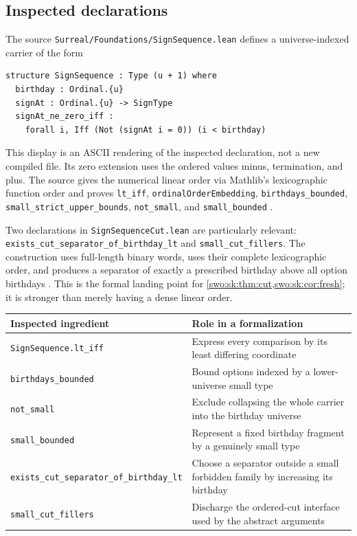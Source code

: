 \documentclass[11pt]{article}
\theoremstyle{definition}
\theoremstyle{remark}
\begin{document}
\subsection{Inspected declarations}

The source \texttt{Surreal/Foundations/SignSequence.lean} defines a
universe-indexed carrier of the form
\begin{lstlisting}
structure SignSequence : Type (u + 1) where
  birthday : Ordinal.{u}
  signAt : Ordinal.{u} -> SignType
  signAt_ne_zero_iff :
    forall i, Iff (Not (signAt i = 0)) (i < birthday)
\end{lstlisting}
This display is an ASCII rendering of the inspected declaration, not a
new compiled file. Its zero extension uses the ordered values minus,
termination, and plus. The source gives the numerical linear order via
Mathlib's lexicographic function order and proves
\texttt{lt\_iff}, \texttt{ordinalOrderEmbedding},
\texttt{birthdays\_bounded}, \texttt{small\_strict\_upper\_bounds},
\texttt{not\_small}, and \texttt{small\_bounded} \cite{ProveItSigns}.

Two declarations in \texttt{SignSequenceCut.lean} are particularly relevant:
\texttt{exists\_\allowbreak cut\_\allowbreak separator\_\allowbreak of\_\allowbreak birthday\_\allowbreak lt}
and \texttt{small\_cut\_fillers}. The construction uses full-length binary words,
uses their complete lexicographic order, and produces a separator of
exactly a prescribed birthday above all option birthdays
\cite{ProveItCutFill}. This is the formal landing point for
\cref{swo:sk:thm:cut,swo:sk:cor:fresh}; it is stronger than merely having a dense
linear order.

\begin{center}
\small
\begin{tabularx}{\textwidth}{@{}>{\raggedright\arraybackslash}p{}Y@{}}
\toprule
Inspected ingredient & Role in a formalization \\
\midrule
\texttt{SignSequence.lt\_iff} & Express every comparison by its least differing coordinate \\
\texttt{birthdays\_bounded} & Bound options indexed by a lower-universe small type \\
\texttt{not\_small} & Exclude collapsing the whole carrier into the birthday universe \\
\texttt{small\_bounded} & Represent a fixed birthday fragment by a genuinely small type \\
\texttt{exists\_\allowbreak cut\_\allowbreak separator\_\allowbreak of\_\allowbreak birthday\_\allowbreak lt} & Choose a separator outside a small forbidden family by increasing its birthday \\
\texttt{small\_cut\_fillers} & Discharge the ordered-cut interface used by the abstract arguments \\
\bottomrule
\end{tabularx}
\end{center}
\end{document}

